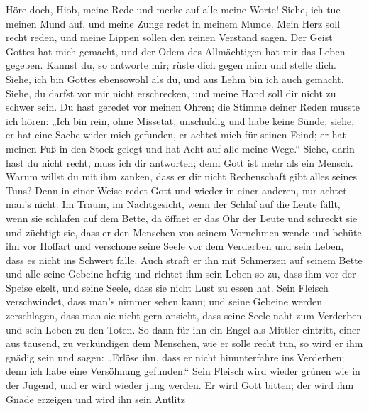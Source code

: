  Höre doch, Hiob, meine Rede und merke auf alle meine
Worte!  Siehe, ich tue meinen Mund auf, und meine Zunge
redet in meinem Munde.  Mein Herz soll recht reden, und
meine Lippen sollen den reinen Verstand sagen.  Der Geist
Gottes hat mich gemacht, und der Odem des Allmächtigen hat mir das Leben
gegeben.  Kannst du, so antworte mir; rüste dich gegen
mich und stelle dich.  Siehe, ich bin Gottes ebensowohl
als du, und aus Lehm bin ich auch gemacht.  Siehe, du
darfst vor mir nicht erschrecken, und meine Hand soll dir nicht zu
schwer sein.  Du hast geredet vor meinen Ohren; die Stimme
deiner Reden musste ich hören:  „Ich bin rein, ohne
Missetat, unschuldig und habe keine Sünde;  siehe, er hat
eine Sache wider mich gefunden, er achtet mich für seinen Feind;
 er hat meinen Fuß in den Stock gelegt und hat Acht auf
alle meine Wege.``  Siehe, darin hast du nicht recht,
muss ich dir antworten; denn Gott ist mehr als ein Mensch.
 Warum willst du mit ihm zanken, dass er dir nicht
Rechenschaft gibt alles seines Tuns?  Denn in einer Weise
redet Gott und wieder in einer anderen, nur achtet man's nicht.
 Im Traum, im Nachtgesicht, wenn der Schlaf auf die Leute
fällt, wenn sie schlafen auf dem Bette,  da öffnet er das
Ohr der Leute und schreckt sie und züchtigt sie,  dass er
den Menschen von seinem Vornehmen wende und behüte ihn vor Hoffart
 und verschone seine Seele vor dem Verderben und sein
Leben, dass es nicht ins Schwert falle.  Auch straft er
ihn mit Schmerzen auf seinem Bette und alle seine Gebeine heftig
 und richtet ihm sein Leben so zu, dass ihm vor der
Speise ekelt, und seine Seele, dass sie nicht Lust zu essen hat.
 Sein Fleisch verschwindet, dass man's nimmer sehen kann;
und seine Gebeine werden zerschlagen, dass man sie nicht gern ansieht,
 dass seine Seele naht zum Verderben und sein Leben zu
den Toten.  So dann für ihn ein Engel als Mittler
eintritt, einer aus tausend, zu verkündigen dem Menschen, wie er solle
recht tun,  so wird er ihm gnädig sein und sagen: „Erlöse
ihn, dass er nicht hinunterfahre ins Verderben; denn ich habe eine
Versöhnung gefunden.``  Sein Fleisch wird wieder grünen
wie in der Jugend, und er wird wieder jung werden.  Er
wird Gott bitten; der wird ihm Gnade erzeigen und wird ihn sein Antlitz
